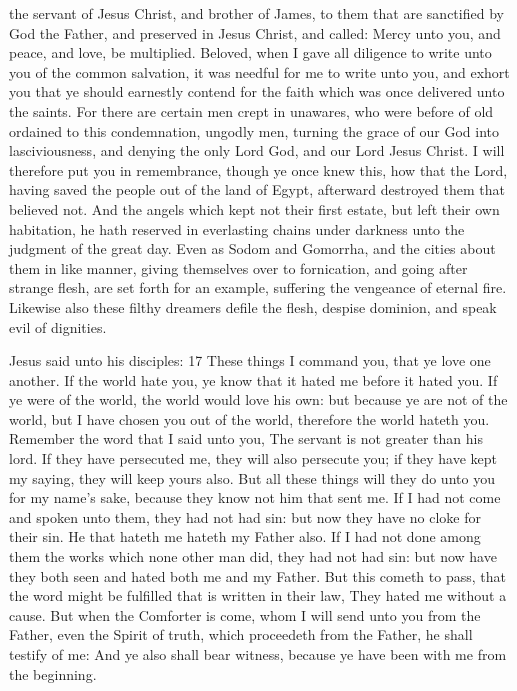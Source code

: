  the servant of Jesus Christ, and brother of James, to them that are sanctified by God the Father, and preserved in Jesus Christ, and called: Mercy unto you, and peace, and love, be multiplied. Beloved, when I gave all diligence to write unto you of the common salvation, it was needful for me to write unto you, and exhort you that ye should earnestly contend for the faith which was once delivered unto the saints. For there are certain men crept in unawares, who were before of old ordained to this condemnation, ungodly men, turning the grace of our God into lasciviousness, and denying the only Lord God, and our Lord Jesus Christ. I will therefore put you in remembrance, though ye once knew this, how that the Lord, having saved the people out of the land of Egypt, afterward destroyed them that believed not. And the angels which kept not their first estate, but left their own habitation, he hath reserved in everlasting chains under darkness unto the judgment of the great day. Even as Sodom and Gomorrha, and the cities about them in like manner, giving themselves over to fornication, and going after strange flesh, are set forth for an example, suffering the vengeance of eternal fire. Likewise also these filthy dreamers defile the flesh, despise dominion, and speak evil of dignities.


 Jesus said unto his disciples: 17 These things I command you, that ye love one another. If the world hate you, ye know that it hated me before it hated you. If ye were of the world, the world would love his own: but because ye are not of the world, but I have chosen you out of the world, therefore the world hateth you. Remember the word that I said unto you, The servant is not greater than his lord. If they have persecuted me, they will also persecute you; if they have kept my saying, they will keep yours also. But all these things will they do unto you for my name's sake, because they know not him that sent me. If I had not come and spoken unto them, they had not had sin: but now they have no cloke for their sin. He that hateth me hateth my Father also. If I had not done among them the works which none other man did, they had not had sin: but now have they both seen and hated both me and my Father. But this cometh to pass, that the word might be fulfilled that is written in their law, They hated me without a cause. But when the Comforter is come, whom I will send unto you from the Father, even the Spirit of truth, which proceedeth from the Father, he shall testify of me: And ye also shall bear witness, because ye have been with me from the beginning.

